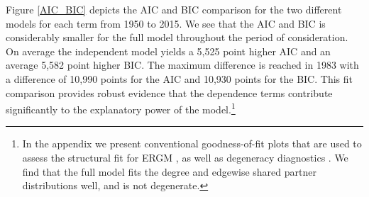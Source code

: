 \documentclass[headsepline=true, abstracton]{scrartcl}
\begin{document}
Figure \ref{AIC_BIC} depicts the AIC and BIC comparison for the two different models for each term from 1950 to 2015. We see that the AIC and BIC is considerably smaller for the full model throughout the period of consideration. On average the independent model yields a 5,525 point higher AIC and an average 5,582 point higher BIC. The maximum difference is reached in 1983 with a difference of 10,990 points for the AIC and 10,930 points for the BIC. This fit comparison provides robust evidence that the dependence terms contribute significantly to the explanatory power of the model.\footnote{In the appendix we present conventional goodness-of-fit plots that are used to assess the structural fit for ERGM \citep{hunter2008goodness}, as well as degeneracy diagnostics \citep{mukherjee2020degeneracy}. We find that the full model fits the degree and edgewise shared partner distributions well, and is not degenerate.} 



\end{document}
